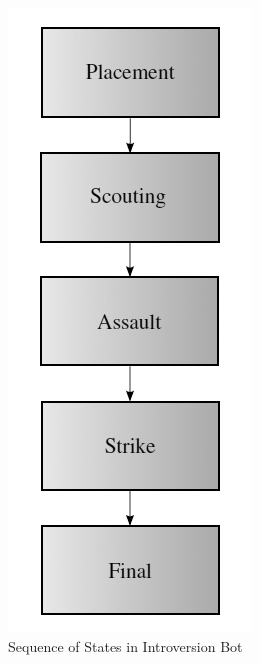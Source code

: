         \begin{figure}[htp]
            \begin{center}
            \includegraphics[scale=0.4]{images/defaultbot.png}
            \caption{Sequence of States in Introversion Bot}
            \label{img:defaultbot}
            \end{center} 
        \end{figure}
        
        \newpage
        
